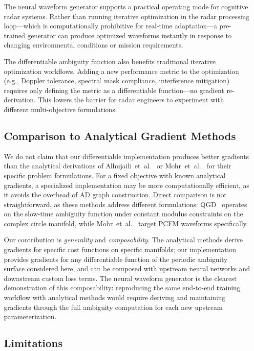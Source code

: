 \documentclass[journal]{IEEEtran}
\begin{document}
The neural waveform generator supports a practical operating mode for cognitive radar systems.
Rather than running iterative optimization in the radar processing loop---which is computationally prohibitive for real-time adaptation---a pre-trained generator can produce optimized waveforms instantly in response to changing environmental conditions or mission requirements.

The differentiable ambiguity function also benefits traditional iterative optimization workflows.
Adding a new performance metric to the optimization (e.g., Doppler tolerance, spectral mask compliance, interference mitigation) requires only defining the metric as a differentiable function---no gradient re-derivation.
This lowers the barrier for radar engineers to experiment with different multi-objective formulations.

\subsection{Comparison to Analytical Gradient Methods}

We do not claim that our differentiable implementation produces better gradients than the analytical derivations of Alhujaili~et~al.~\cite{alhujaili2020quartic} or Mohr~et~al.~\cite{mohr2021gradient} for their specific problem formulations.
For a fixed objective with known analytical gradients, a specialized implementation may be more computationally efficient, as it avoids the overhead of AD graph construction.
Direct comparison is not straightforward, as these methods address different formulations: QGD~\cite{alhujaili2020quartic} operates on the slow-time ambiguity function under constant modulus constraints on the complex circle manifold, while Mohr~et~al.~\cite{mohr2021gradient} target PCFM waveforms specifically.

Our contribution is \emph{generality} and \emph{composability}.
The analytical methods derive gradients for specific cost functions on specific manifolds; our implementation provides gradients for any differentiable function of the periodic ambiguity surface considered here, and can be composed with upstream neural networks and downstream custom loss terms.
The neural waveform generator is the clearest demonstration of this composability: reproducing the same end-to-end training workflow with analytical methods would require deriving and maintaining gradients through the full ambiguity computation for each new upstream parameterization.

\subsection{Limitations}
\end{document}
